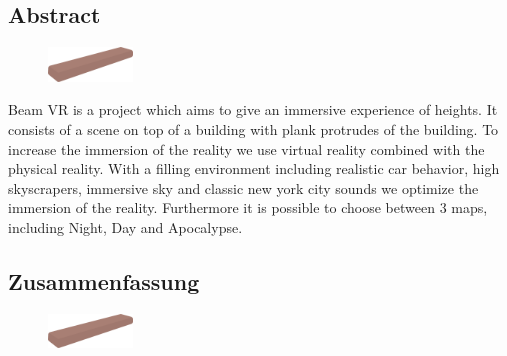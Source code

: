 \begin{spacing}{1}

    \chapter*{Abstract}

\end{spacing}

\begin{figure}

    \begin{center}

        \includegraphics[width=0.2\textwidth]{pics/abstract_picture_1}

    \end{center}

\end{figure}

Beam VR is a project which aims to give an immersive experience of heights.
It consists of a scene on top of a building with plank protrudes of the building.
To increase the immersion of the reality we use virtual reality combined with the physical reality.
With a filling environment including realistic car behavior, high skyscrapers, immersive sky and classic new york city sounds we optimize the immersion of the reality.
Furthermore it is possible to choose between 3 maps, including Night, Day and Apocalypse.

\newpage

\begin{spacing}{1}

    \chapter*{Zusammenfassung}

\end{spacing}

\begin{figure}

    \begin{center}

        \includegraphics[width=0.2\textwidth]{pics/abstract_picture_1}

    \end{center}

\end{figure}

